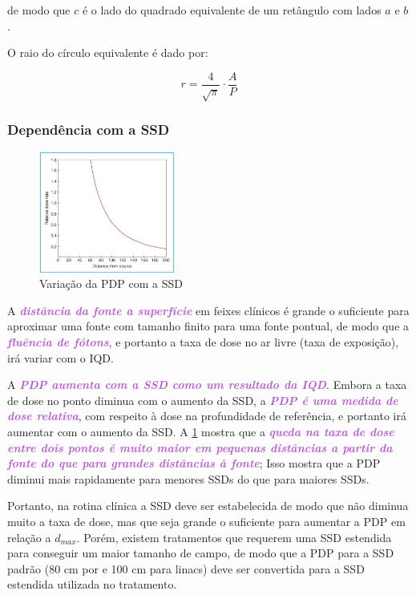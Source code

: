 \documentclass[11pt,a4paper]{article}
\begin{document}
	de modo que $c$ é o lado do quadrado equivalente de um retângulo com lados $a$ e $b$.

	O raio do círculo equivalente é dado por:

	\begin{equation}
		r = \frac{4}{\sqrt{\pi}} \cdot \frac{A}{P}
		\label{eq:raioEquivalente}
	\end{equation}

	\subsubsection*{Dependência com a SSD}

	\begin{figure}
		\centering
		\includegraphics[width=0.4\textwidth]{Imagens/pdpSsd.JPG}
		\caption{Variação da PDP com a SSD}
		\label{fig:pdpSsd}
	\end{figure}

	A \textcolor{MediumOrchid}{\textbf{\textit{distância da fonte a superfície}}} em feixes clínicos é grande o suficiente para aproximar uma fonte com tamanho finito para uma fonte pontual, de modo que a \textcolor{MediumOrchid}{\textbf{\textit{fluência de fótons}}}, e portanto a taxa de dose no ar livre (taxa de exposição), irá variar com o IQD. 

	A \textcolor{MediumOrchid}{\textbf{\textit{PDP aumenta com a SSD como um resultado da IQD}}}. Embora a taxa de dose no ponto diminua com o aumento da SSD, a \textcolor{MediumOrchid}{\textbf{\textit{PDP é uma medida de dose relativa}}}, com respeito à dose na profundidade de referência, e portanto irá aumentar com o aumento da SSD. A \ref{fig:pdpSsd} mostra que a \textcolor{MediumOrchid}{\textbf{\textit{queda na taxa de dose entre dois pontos é muito maior em pequenas distâncias a partir da fonte do que para grandes distâncias à fonte}}}; Isso mostra que a PDP diminui mais rapidamente para menores SSDs do que para maiores SSDs. 

	Portanto, na rotina clínica a SSD deve ser estabelecida de modo que não diminua muito a taxa de dose, mas que seja grande o suficiente para aumentar a PDP em relação a $d_{max}$. Porém, existem tratamentos que requerem uma SSD estendida para conseguir um maior tamanho de campo, de modo que a PDP para a SSD padrão (80 cm por  e 100 cm para linacs) deve ser convertida para a SSD estendida utilizada no tratamento. 
\end{document}
